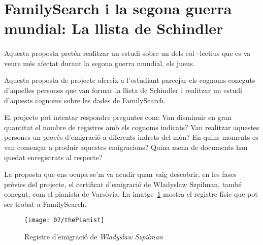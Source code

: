 \section{FamilySearch i la segona guerra mundial: La llista de Schindler}

    \paragraph{}
    Aquesta proposta pretén realitzar un estudi sobre un dels col·lectius que es va veure més afectat durant la segona guerra mundial, els jueus.

    Aquesta proposta de projecte ofereix a l'estudiant parcejar els cognoms coneguts d'aquelles persones que van formar la llista de Schindler i realitzar un estudi d'aquests cognoms sobre les dades de FamilySearch.

    El projecte pot intentar respondre preguntes com: Van disminuir en gran quantitat el nombre de registres amb els cognoms indicats? Van realitzar aquestes persones un procés d'emigració a diferents indrets del món? En quins moments es van començar a produir aquestes emigracions? Quina mena de documents han quedat enregistrats al respecte?

    La proposta que ens ocupa se'm va acudir quan vaig descobrir, en les fases prèvies del projecte, el certificat d'emigració de Wladyslaw Szpilman, també conegut, com el pianista de Varsòvia. La imatge~\ref{fig:thePianist} mostra el registre físic que pot ser trobat a FamilySearch.

    \begin{figure}[h]
        \texttt{[image: 07/thePianist]}
        \centering
        \caption{Registre d'emigració de \emph{Wladyslaw Szpilman}\label{fig:thePianist}}
    \end{figure}
